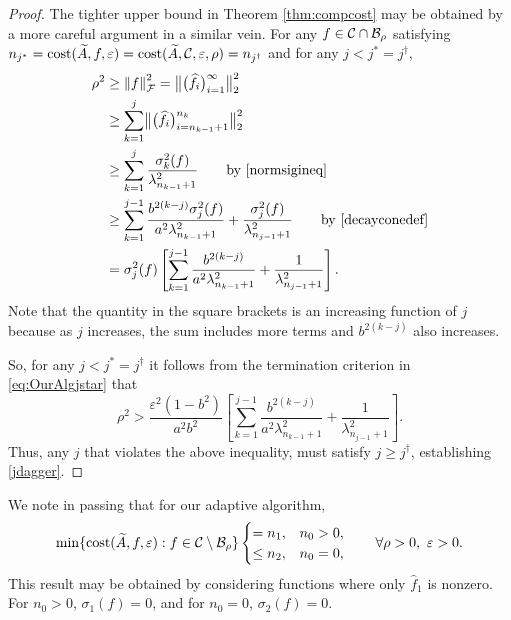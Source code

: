 \documentclass[graybox,footinfo]{svmult}
\newcommand{\DHJRnorm}[2][{}]{\ensuremath{\left \lVert #2 \right \rVert}_{#1}}
\newcommand{\DHJRbignorm}[2][{}]{\ensuremath{\bigl \lVert #2 \bigr \rVert}_{#1}}
\begin{document}
\begin{proof}
The tighter upper bound in Theorem \ref{thm:compcost} may be obtained by a more careful argument in a similar vein.  
For any $f \in  {\mathcal{C}} \cap {\mathcal{B}}_\rho$ satisfying $n_{j^*} = \textup{cost}(\widetilde{A},f,\varepsilon) = \textup{cost}(\widetilde{A}, {\mathcal{C}}, \varepsilon, \rho) = n_{j^{\dagger}}$ and for any $j < j^* = j^\dagger$,
\begin{align*}
\rho^2 &\ge \DHJRnorm[\calF]{f}^2 = \DHJRbignorm[2]{\big( \widehat{f}_i \big)_{i=1}^{\infty}}^2 \\
& \ge \sum_{k=1}^j \DHJRbignorm[2]{\big( \widehat{f}_i \big)_{i=n_{k-1}+1}^{n_k}}^2 \\
& \ge \sum_{k=1}^j \frac{\sigma_k^2(f)}{\lambda_{n_{k-1}+1}^2} \qquad \text{by \eqref{normsigineq}}\\
& \ge \sum_{k=1}^{j-1} \frac{ b^{2(k-j)}\sigma_j^2(f)}{a^{2}\lambda_{n_{k-1}+1}^2} + \frac{\sigma_j^2(f)}{\lambda_{n_{j-1}+1}^2} \qquad \text{by \eqref{decayconedef}} \\
& = \sigma_j^2(f) \left[ \sum_{k=1}^{j-1} \frac{b^{2(k-j)}}{a^{2} \lambda_{n_{k-1}+1}^2} + \frac{1}{\lambda_{n_{j-1}+1}^2}\right].
\end{align*}
Note that the quantity in the square brackets is an increasing function of $j$ because as $j$ increases, the sum includes more terms and $b^{2(k-j)}$ also increases.

So, for any $j < j^* = j^\dagger$ it follows from the termination criterion in \eqref{eq:OurAlgjstar} that
\begin{equation*}
\rho^2 > \frac{\varepsilon^2(1 - b^2)}{a^2b^2} \left[ \sum_{k=1}^{j-1} \frac{ b^{2(k-j)}}{a^{2}\lambda_{n_{k-1}+1}^2} + \frac{1}{\lambda_{n_{j-1}+1}^2}\right].
\end{equation*}
Thus, any $j$ that violates the above inequality, must satisfy $j \ge j^\dagger$, establishing \eqref{jdagger}.
\end{proof}

We note in passing that for our adaptive algorithm,
\begin{equation*}
 \min \{\textup{cost}(\widetilde{A},f,\varepsilon) : f \in {\mathcal{C}}\setminus {\mathcal{B}}_\rho \} 
 \begin{cases} = n_1, & n_0 > 0, \\
 \le n_2, & n_0 = 0, 
 \end{cases}
 \qquad \forall \rho > 0, \ \varepsilon > 0.
\end{equation*}
This result may be obtained by considering functions where only $\widehat{f}_1$ is nonzero.  For $n_0 > 0$, $\sigma_1(f) = 0$, and for $n_0 = 0$, $\sigma_2(f) = 0$.
\end{document}
